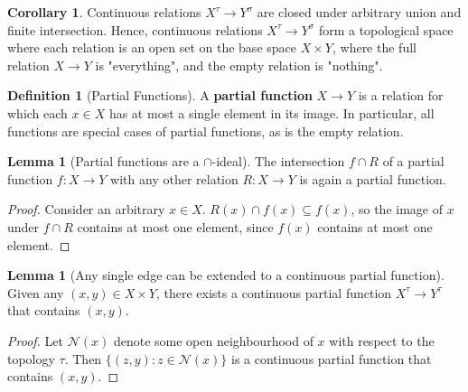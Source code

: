 \documentclass{tufte-handout}
\theoremstyle{definition}
\newtheorem{corollary}[theorem]{Corollary}
\newtheorem{lemma}[theorem]{Lemma}
\newtheorem{defn}[theorem]{Definition}
\newtheorem{rem}[theorem]{Reminder}
\begin{document}
\begin{corollary}\label{cor:homspace}
Continuous relations $X^\tau \rightarrow Y^\sigma$ are closed under arbitrary union and finite intersection. Hence, continuous relations $X^\tau \rightarrow Y^\sigma$ form a topological space where each relation is an open set on the base space $X \times Y$, where the full relation $X \rightarrow Y$ is "everything", and the empty relation is "nothing".
\end{corollary}


\begin{defn}[Partial Functions]
A \textbf{partial function} $X \rightarrow Y$ is a relation for which each $x \in X$ has at most a single element in its image. In particular, all functions are special cases of partial functions, as is the empty relation.
\end{defn}

\begin{lemma}[Partial functions are a $\cap$-ideal]\label{lem:capideal}
The intersection $f \cap R$ of a partial function $f: X \rightarrow Y$ with any other relation $R: X \rightarrow Y$ is again a partial function.
\begin{proof}
Consider an arbitrary $x \in X$. $R(x) \cap f(x) \subseteq f(x)$, so the image of $x$ under $f \cap R$ contains at most one element, since $f(x)$ contains at most one element.
\end{proof}
\end{lemma}

\begin{lemma}[Any single edge can be extended to a continuous partial function]\label{lem:edgecomplete}
Given any $(x,y) \in X \times Y$, there exists a continuous partial function $X^\tau \rightarrow Y^\tau$ that contains $(x,y)$.
\begin{proof}
Let $\mathcal{N}(x)$ denote some open neighbourhood of $x$ with respect to the topology $\tau$. Then $\{ (z,y) : z \in \mathcal{N}(x) \}$ is a continuous partial function that contains $(x,y)$.
\end{proof}
\end{lemma}
\end{document}
